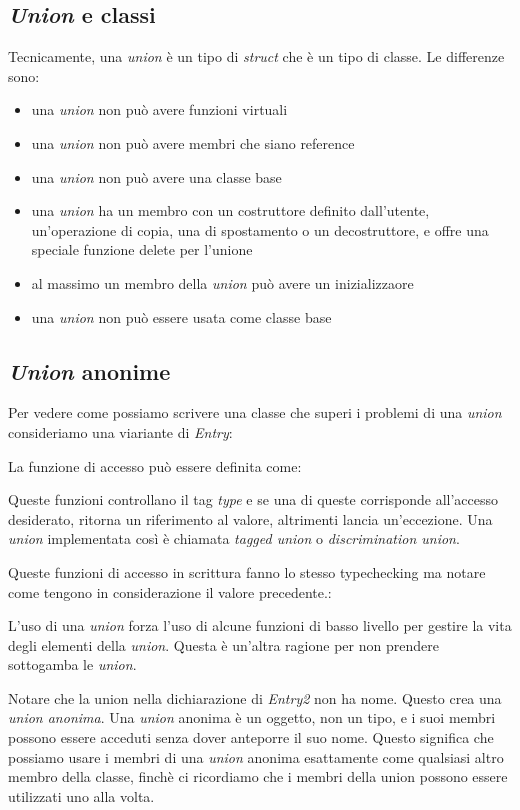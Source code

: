 \documentclass[11pt,a4paper]{book}
\begin{document}
\subsection{\emph{Union} e classi}
Tecnicamente, una \emph{union} è un tipo di \emph{struct} che è un tipo di classe. Le differenze sono:
\begin{itemize}
	\item una \emph{union} non può avere funzioni virtuali
	\item una \emph{union} non può avere membri che siano reference
	\item una \emph{union} non può avere una classe base
	\item una \emph{union} ha un membro con un costruttore definito dall'utente, un'operazione di copia, una di spostamento o un decostruttore, e offre una speciale funzione delete per l'unione
	\item al massimo un membro della \emph{union} può avere un inizializzaore
	\item una \emph{union} non può essere usata come classe base
\end{itemize}

\subsection{\emph{Union} anonime}
Per vedere come possiamo scrivere una classe che superi i problemi di una \emph{union} consideriamo una viariante di \emph{Entry}:
\label{code: 116}

La funzione di accesso può essere definita come:
\label{code: 117}

Queste funzioni controllano il tag \emph{type} e se una di queste corrisponde all'accesso desiderato, ritorna un riferimento al valore, altrimenti lancia un'eccezione. Una \emph{union} implementata così è chiamata \emph{tagged union} o \emph{discrimination union}.

Queste funzioni di accesso in scrittura fanno lo stesso typechecking ma notare come tengono in considerazione il valore precedente.:
\label{code: 118}

L'uso di una \emph{union} forza l'uso di alcune funzioni di basso livello per gestire la vita degli elementi della \emph{union}. Questa è un'altra ragione per non prendere sottogamba le \emph{union}. 

Notare che la union nella dichiarazione di \emph{Entry2} non ha nome. Questo crea una \emph{union anonima}. Una \emph{union} anonima è un oggetto, non un tipo, e i suoi membri possono essere acceduti senza dover anteporre il suo nome. Questo significa che possiamo usare i membri di una \emph{union} anonima esattamente come qualsiasi altro membro della classe, finchè ci ricordiamo che i membri della union possono essere utilizzati uno alla volta.
\end{document}
